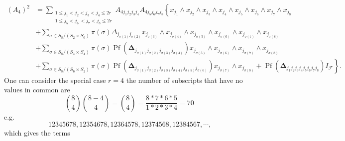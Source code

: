 \documentclass[aps, preprint]{revtex4}
\begin{document}
\begin{align}\left (A_{4}\right )^{2} &  =\sum _{\begin{array}{c}1 \leq j_{1} <j_{2} <j_{3} <j_{4} \leq 2 r \\
1 \leq j_{5} <j_{6}\, <j_{7} <j_{8} \leq 2 r\end{array}}A_{4 j_{1} j_{2} j_{3} j_{4}} A_{4 j_{5} j_{6} j_{7} j_{8}}\left \{x_{j_{1}} \wedge x_{j_{2}} \wedge x_{j_{3}} \wedge x_{j_{4}} \wedge x_{j_{5}} \wedge x_{j_{6}} \wedge x_{j_{7}} \wedge x_{j_{8}}\right . \\
 &  +\sum _{\sigma  \in S_{8}/\left (S_{2} \times S_{6}\right )}\pi  \left (\sigma \right )  \Delta _{j_{\sigma  \left (1\right )} j_{\sigma  \left (2\right )}}x_{j_{\sigma  \left (3\right )}} \wedge x_{j_{\sigma  \left (4\right )}} \wedge x_{j_{\sigma  \left (5\right )}} \wedge x_{j_{\sigma  \left (6\right )}} \wedge x_{j_{\sigma  \left (7\right )}} \wedge x_{j_{\sigma  \left (8\right )}} \\
 &  +\sum _{\sigma  \in S_{8}/\left (S_{4} \times S_{4}\right )}\pi  \left (\sigma \right ) \ensuremath{\operatorname*{Pf}} \left (\mathbf{\Delta }_{j_{\sigma  \left (1\right )} j_{\sigma  \left (2\right )} j_{\sigma  \left (3\right )} j_{\sigma  \left (4\right )}}\right ) x_{j_{\sigma  \left (5\right )}} \wedge x_{j_{\sigma  \left (6\right )}} \wedge x_{j_{\sigma  \left (7\right )}} \wedge x_{j_{\sigma  \left (8\right )}} \\
 &  +\left .\sum _{\sigma  \in S_{8}/\left (S_{6} \times S_{2}\right )}\pi  \left (\sigma \right ) \ensuremath{\operatorname*{Pf}} \left (\mathbf{\Delta }_{j_{\sigma  \left (1\right )} j_{\sigma  \left (2\right )} j_{\sigma  \left (3\right )} j_{\sigma  \left (4\right )} j_{\sigma  \left (5\right )} j_{\sigma  \left (6\right )}}\right ) x_{j_{\sigma  \left (7\right )}} \wedge x_{j_{\sigma  \left (8\right )}} +\ensuremath{\operatorname*{Pf}} \left (\mathbf{\Delta }_{j_{1} j_{2} j_{3} j_{4} j_{5} j_{6} j_{7} j_{8}}\right ) I_{\mathcal{F}}\right \}\text{.}\end{align}One can consider the special case $r =4$ the number of subscripts that have no values in common are
\begin{equation}\binom{8}{4} \binom{8 -4}{4} =\binom{8}{4} =\frac{8 \ast 7 \ast 6 \ast 5}{1 \ast 2 \ast 3 \ast 4} =70
\end{equation}e.g.
\begin{equation}12345678,12354678,12364578,12374568,12384567 ,\cdots \text{,}
\end{equation}which gives the terms
\end{document}
